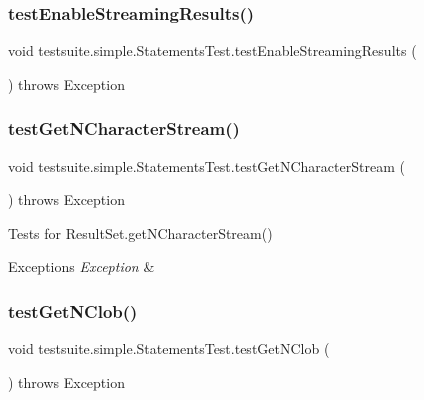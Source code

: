 \subsubsection{\texorpdfstring{test\+Enable\+Streaming\+Results()}{testEnableStreamingResults()}}
{\footnotesize\ttfamily void testsuite.\+simple.\+Statements\+Test.\+test\+Enable\+Streaming\+Results (\begin{DoxyParamCaption}{ }\end{DoxyParamCaption}) throws Exception}

\mbox{\label{classtestsuite_1_1simple_1_1_statements_test_a53d8b06c4026d32f528f16fd1284b7ba}} 
\subsubsection{\texorpdfstring{test\+Get\+N\+Character\+Stream()}{testGetNCharacterStream()}}
{\footnotesize\ttfamily void testsuite.\+simple.\+Statements\+Test.\+test\+Get\+N\+Character\+Stream (\begin{DoxyParamCaption}{ }\end{DoxyParamCaption}) throws Exception}

Tests for Result\+Set.\+get\+N\+Character\+Stream()


\begin{DoxyExceptions}{Exceptions}
{\em Exception} & \\
\hline
\end{DoxyExceptions}
\mbox{\label{classtestsuite_1_1simple_1_1_statements_test_a536b53923bd42d63d56f1105e13def2a}} 
\subsubsection{\texorpdfstring{test\+Get\+N\+Clob()}{testGetNClob()}}
{\footnotesize\ttfamily void testsuite.\+simple.\+Statements\+Test.\+test\+Get\+N\+Clob (\begin{DoxyParamCaption}{ }\end{DoxyParamCaption}) throws Exception}

